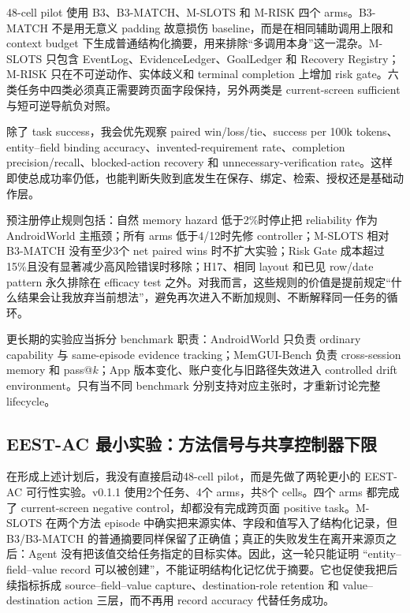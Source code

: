 \documentclass[12pt,a4paper]{ctexart}
\begin{document}
48-cell pilot 使用 B3、B3-MATCH、M-SLOTS 和 M-RISK 四个 arms。B3-MATCH 不是用无意义 padding 故意损伤 baseline，而是在相同辅助调用上限和 context budget 下生成普通结构化摘要，用来排除“多调用本身”这一混杂。M-SLOTS 只包含 EventLog、EvidenceLedger、GoalLedger 和 Recovery Registry；M-RISK 只在不可逆动作、实体歧义和 terminal completion 上增加 risk gate。六类任务中四类必须真正需要跨页面字段保持，另外两类是 current-screen sufficient 与短可逆导航负对照。

除了 task success，我会优先观察 paired win/loss/tie、success per 100k tokens、entity--field binding accuracy、invented-requirement rate、completion precision/recall、blocked-action recovery 和 unnecessary-verification rate。这样即使总成功率仍低，也能判断失败到底发生在保存、绑定、检索、授权还是基础动作层。

预注册停止规则包括：自然 memory hazard 低于2\%时停止把 reliability 作为 AndroidWorld 主瓶颈；所有 arms 低于4/12时先修 controller；M-SLOTS 相对 B3-MATCH 没有至少3个 net paired wins 时不扩大实验；Risk Gate 成本超过15\%且没有显著减少高风险错误时移除；H17、相同 layout 和已见 row/date pattern 永久排除在 efficacy test 之外。对我而言，这些规则的价值是提前规定“什么结果会让我放弃当前想法”，避免再次进入不断加规则、不断解释同一任务的循环。

更长期的实验应当拆分 benchmark 职责：AndroidWorld 只负责 ordinary capability 与 same-episode evidence tracking；MemGUI-Bench 负责 cross-session memory 和 pass@$k$；App 版本变化、账户变化与旧路径失效进入 controlled drift environment。只有当不同 benchmark 分别支持对应主张时，才重新讨论完整 lifecycle。

\subsection{EEST-AC 最小实验：方法信号与共享控制器下限}

在形成上述计划后，我没有直接启动48-cell pilot，而是先做了两轮更小的 EEST-AC 可行性实验。v0.1.1 使用2个任务、4个 arms，共8个 cells。四个 arms 都完成了 current-screen negative control，却都没有完成跨页面 positive task。M-SLOTS 在两个方法 episode 中确实把来源实体、字段和值写入了结构化记录，但 B3/B3-MATCH 的普通摘要同样保留了正确值；真正的失败发生在离开来源页之后：Agent 没有把该值交给任务指定的目标实体。因此，这一轮只能证明 ``entity--field--value record 可以被创建''，不能证明结构化记忆优于摘要。它也促使我把后续指标拆成 source--field--value capture、destination-role retention 和 value--destination action 三层，而不再用 record accuracy 代替任务成功。
\end{document}
